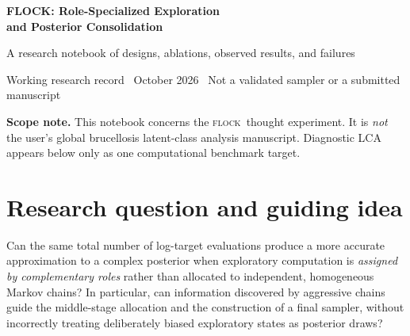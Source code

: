 \documentclass[11pt,letterpaper]{article}
\newcommand{\flock}{\textsc{flock}}
\begin{document}
\begin{center}
{\Large\bfseries\color{ink} FLOCK: Role-Specialized Exploration\\[4pt] and Posterior Consolidation}\par
\vspace{7pt}
{\large A research notebook of designs, ablations, observed results, and failures}\par
\vspace{8pt}
{\small Working research record \textbullet\ October 2026 \textbullet\ Not a validated sampler or a submitted manuscript}
\end{center}
\vspace{6pt}
\begin{abstract}
We document an exploratory attempt to improve computational exploration of challenging posterior distributions by assigning different roles to multiple chains: aggressive scouts, local followers, novelty-seeking or geometry-guided pioneers, and a final posterior inference stage. We distinguish exploratory state discovery from valid posterior sampling, describe a collection of controlled and less-controlled simulation variants, and report the numerical results that could be recovered from original saved summary tables and a partial console log. Results were mixed: some heuristics improved selected errors in particular settings, while randomized ablations, adaptive Metropolis controls, and more difficult benchmarks exposed fragility and lack of consistent superiority. A subsequent importance-weighted consolidation experiment yielded encouraging pilot comparisons to matched undirected exploration but is a different estimator from a terminal Metropolis--Hastings chain. This document is a \emph{transparent developmental record}, not evidence of algorithmic novelty, general efficiency, convergence, or frequentist validity.
\end{abstract}
\textbf{Scope note.} This notebook concerns the \flock\ thought experiment. It is \emph{not} the user's global brucellosis latent-class analysis manuscript. Diagnostic LCA appears below only as one computational benchmark target.
\tableofcontents
\newpage

\section{Research question and guiding idea}
Can the same total number of log-target evaluations produce a more accurate approximation to a complex posterior when exploratory computation is \emph{assigned by complementary roles} rather than allocated to independent, homogeneous Markov chains? In particular, can information discovered by aggressive chains guide the middle-stage allocation and the construction of a final sampler, without incorrectly treating deliberately biased exploratory states as posterior draws?
\end{document}
